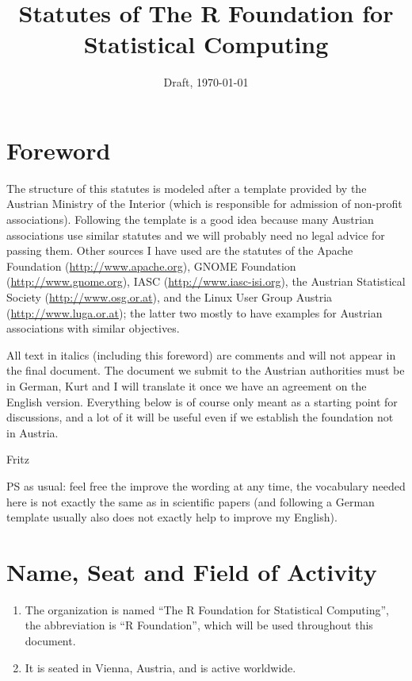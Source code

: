 \documentclass[a4paper]{article}
\title{\bf Statutes of The R Foundation for Statistical Computing}
\date{Draft, \today}
\begin{document}
\maketitle

\it

\section*{Foreword}

The structure of this statutes is modeled after a template provided by
the Austrian Ministry of the Interior (which is responsible for
admission of non-profit associations). Following the template is a
good idea because many Austrian associations use similar statutes and we
will probably need no legal advice for passing them. Other sources I
have used are the statutes of
the Apache Foundation (\url{http://www.apache.org}),
GNOME Foundation (\url{http://www.gnome.org}),
IASC (\url{http://www.iasc-isi.org}),
the Austrian Statistical Society (\url{http://www.osg.or.at}),
and the Linux User Group Austria (\url{http://www.luga.or.at});
the latter two mostly to have examples
for Austrian associations with similar objectives.

All text in italics (including this foreword) are comments and will
not appear in the final document. The document we submit to the
Austrian authorities must be in German, Kurt and I will translate it
once we have an agreement on the English version. Everything below is
of course only meant as a starting point for discussions, and a lot of
it will be useful even if we establish the foundation not in Austria.

\medskip\noindent
Fritz

\medskip\noindent
PS as usual: feel free the improve the wording at any time, the
vocabulary needed here is not exactly the same as in scientific
papers (and following a German template usually also does not exactly
help to improve my English).

\rm

\section{Name, Seat and Field of Activity}

\begin{enumerate}
 \item The organization is named ``The R Foundation for Statistical
  Computing'', the abbreviation is ``R Foundation'', which will be used
  throughout this document.
 \item It is seated in Vienna, Austria, and is active worldwide.
\end{enumerate}
\end{document}
